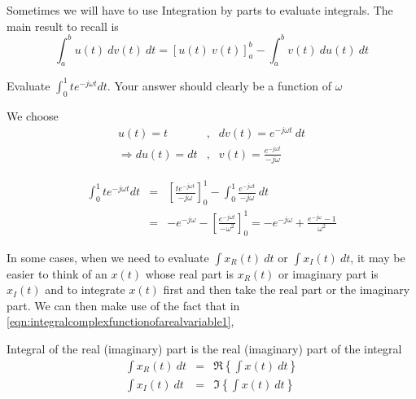 Sometimes we will have to use Integration by parts to evaluate integrals. The main result to recall is
\begin{equation}
\label{eq:byparts}
\displaystyle{\int_a^b u(t) \ dv(t) \ dt = \left[ u(t) \ v(t) \right]_a^b - \int_a^b v(t) \ du(t) \ dt}
\end{equation}

\begin{example}
Evaluate $\displaystyle{\int_0^1 t e^{-j \omega t} dt}$. Your answer should clearly be a function of $\omega$
\end{example}

We choose
\begin{eqnarray}
\nonumber
u(t) = t &,& dv(t) = e^{-j \omega t} \ dt \\
\nonumber
\Longrightarrow du(t)=dt &,&  v(t) = \frac{e^{-j \omega t}}{-j \omega}
\end{eqnarray}

\begin{eqnarray}
\nonumber
\int_0^1 t e^{-j \omega t} dt  & = & \displaystyle{\left[\frac{t e^{-j \omega t}}{-j \omega}\right]_0^1 - \int_0^1 \frac{e^{-j \omega t}}{-j \omega} \ dt}\\
\nonumber
& = & - e^{-j \omega} - \displaystyle{\left[\frac{e^{-j \omega t}}{-\omega^2} \right]_0^1} = - e^{-j \omega} +
\frac{e^{-j \omega}-1}{\omega^2}
\end{eqnarray}

In some cases, when we need to evaluate $\int x_R(t) \ dt$ or $\int x_I(t) \ dt$, it may be easier to think of an $x(t)$ whose real part is $x_R(t)$ or imaginary part is $x_I(t)$ and to integrate $x(t)$ first and then take the real part or the imaginary part.
We can then make use of the fact that in \eqref{eqn:integralcomplexfunctionofarealvariable1},
\begin{hintbox}{Integral of the real (imaginary) part is the real (imaginary) part of the integral}
\begin{eqnarray*}
\int x_R(t) \ dt  & = & \Re \left\{ \int x(t) \ dt \right\} \\
\int x_I(t) \ dt  & = & \Im \left\{ \int x(t) \ dt \right\}
\end{eqnarray*}
\end{hintbox}

